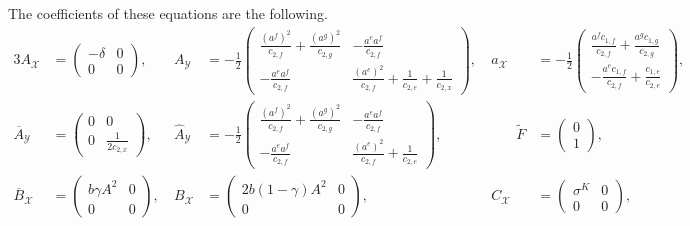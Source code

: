 \documentclass[11pt,twoside]{amsart}
\theoremstyle{definition}
\numberwithin{equation}{section}
\renewcommand{\hat}{\widehat}
\begin{document}
The coefficients of these equations are the following.
\begin{alignat*}{3}
    A_{\mathcal{X}} &= \begin{pmatrix}
        -\delta & 0 \\ 0 & 0
    \end{pmatrix}, &\
    A_{\mathcal{Y}} &= -\frac{1}{2}\begin{pmatrix}
        \frac{(a^f)^2}{c_{2,f}} + \frac{(a^g)^2}{c_{2,g}} & -\frac{a^e a^f}{c_{2,f}} \\
        -\frac{a^e a^f}{c_{2,f}} & \frac{(a^e)^2}{c_{2,f}} + \frac{1}{c_{2,e}} + \frac{1}{c_{2,x}}
    \end{pmatrix}, &\
    a_{\mathcal{X}} &= -\frac{1}{2}\begin{pmatrix}
        \frac{a^f c_{1,f}}{c_{2,f}} + \frac{a^g c_{1,g}}{c_{2,g}} \\
        -\frac{a^e c_{1,f}}{c_{2,f}} + \frac{c_{1,e}}{c_{2,e}}
    \end{pmatrix},
     \\[10pt]
    \overline{A}_{\mathcal{Y}} &= \begin{pmatrix}
        0 & 0 \\ 0 & \frac{1}{2c_{2,x}}
    \end{pmatrix}, &\
    \hat{A}_{\mathcal{Y}} &= -\frac{1}{2}\begin{pmatrix}
        \frac{(a^f)^2}{c_{2,f}} + \frac{(a^g)^2}{c_{2,g}} & -\frac{a^e a^f}{c_{2,f}} \\
        -\frac{a^e a^f}{c_{2,f}} & \frac{(a^e)^2}{c_{2,f}} + \frac{1}{c_{2,e}}
    \end{pmatrix},
    &\qquad
    \widetilde{F} &= \begin{pmatrix} 0 \\ 1 \end{pmatrix}, \\[10pt]
    \overline{B}_{\mathcal{X}} &= \begin{pmatrix}
        b\gamma A^2 & 0 \\ 0 & 0
    \end{pmatrix}, &\
    B_{\mathcal{X}} &= \begin{pmatrix}
        2b(1-\gamma)A^2 & 0 \\ 0 & 0
    \end{pmatrix}, &\
    C_{\mathcal{X}} &= \begin{pmatrix}
        \sigma^K & 0 \\ 0 & 0
    \end{pmatrix}, \\[10pt]

\end{alignat*}
\end{document}
